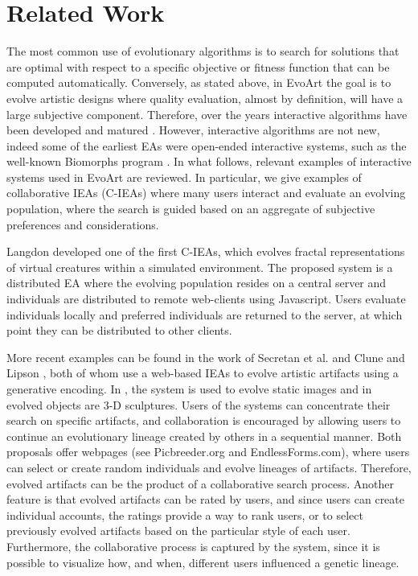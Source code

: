 \documentclass{sig-alternate}
\begin{document}
\section{Related Work}
\label{sec:related}
The most common use of evolutionary algorithms is to search for solutions that are optimal with respect to a specific objective or fitness function that can be computed automatically.
Conversely, as stated above, in EvoArt the goal is to evolve artistic designs where quality evaluation, almost by definition, will have a large subjective component.
Therefore, over the years interactive algorithms have been developed and matured \cite{ie1,ie2}.
However, interactive algorithms are not new, indeed some of the earliest EAs were open-ended interactive systems, such as the well-known Biomorphs program \cite{biomorphs}.
In what follows, relevant examples of interactive systems used in EvoArt are reviewed.
In particular, we give examples of collaborative IEAs (C-IEAs) where many users interact and evaluate an evolving population, where the search is guided
based on an aggregate of subjective preferences and considerations.

Langdon \cite{langdon:2004} developed one of the first C-IEAs, which evolves fractal representations of virtual creatures within a simulated environment.
The proposed system is a distributed EA where the evolving population resides on a central server and individuals are distributed
to remote web-clients using Javascript.
Users evaluate individuals locally and preferred individuals are returned to the server, at which point they can be distributed to other clients.

More recent examples can be found in the work of Secretan et al. \cite{picbreeder} and Clune and Lipson \cite{forms}, both of whom use a web-based IEAs to evolve artistic artifacts
using a generative encoding.
In \cite{picbreeder}, the system is used to evolve static images and in \cite{forms} evolved objects are 3-D sculptures.
Users of the systems can concentrate their search on specific artifacts, and collaboration is encouraged by allowing users to continue an evolutionary lineage created by others
in a sequential manner.
Both proposals offer webpages (see Picbreeder.org and EndlessForms.com),
where users can select or create random individuals and evolve lineages of artifacts.
Therefore, evolved artifacts can be the product of a collaborative search process.
Another feature is that evolved artifacts can be rated by users, and since users can create individual accounts, the ratings provide a way to rank users,
or to select previously evolved artifacts based on the particular style of each user.
Furthermore, the collaborative process is captured by the system, since it is possible to visualize how, and when, different users influenced
a genetic lineage.
\end{document}
